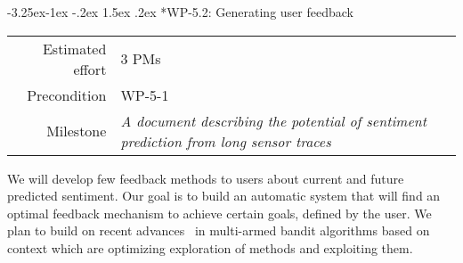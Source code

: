 \documentclass[12pt]{article}
\makeatletter
\renewcommand\paragraph{\@startsection{paragraph}{4}{\z@}%
  {-3.25ex\@plus -1ex \@minus -.2ex}%
  {1.5ex \@plus .2ex}%
  {\normalfont\normalsize\bfseries}}
\makeatother
\begin{document}
\paragraph*{WP-5.2: Generating user feedback}
\begin{tabular}{rl}
	Estimated effort& 3 PMs\\
	Precondition & WP-5-1\\
	Milestone & \begin{minipage}[t]{12.2cm}
		\textit{A document describing the potential of sentiment prediction from long sensor traces}\vspace{.2cm}
	\end{minipage}
\end{tabular}

\noindent
We will develop few feedback methods to users about current and future predicted sentiment. Our goal is to build an automatic system that will find an optimal feedback mechanism to achieve certain goals, defined by the user. We plan to build on recent advances~\cite{DBLP:journals/ml/CrammerG13} in multi-armed bandit algorithms based on context which are optimizing exploration of methods and exploiting them.
\end{document}
